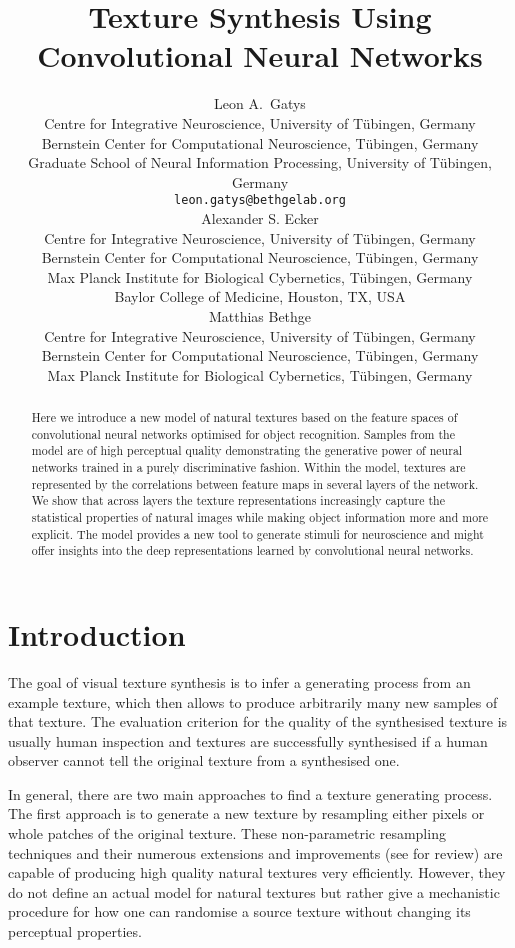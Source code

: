 \documentclass{article} %
\title{Texture Synthesis Using Convolutional Neural Networks}
\author{
Leon A.~Gatys\\
Centre for Integrative Neuroscience, University of T\"ubingen, Germany\\
Bernstein Center for Computational Neuroscience, T\"ubingen, Germany\\
Graduate School of Neural Information Processing, University of T\"ubingen, Germany\\
\texttt{leon.gatys@bethgelab.org} \\
\And
Alexander S. Ecker\\
Centre for Integrative Neuroscience, University of T\"ubingen, Germany\\
Bernstein Center for Computational Neuroscience, T\"ubingen, Germany\\
Max Planck Institute for Biological Cybernetics, T\"ubingen, Germany\\
Baylor College of Medicine, Houston, TX, USA\\
\And
Matthias Bethge \\
Centre for Integrative Neuroscience, University of T\"ubingen, Germany\\
Bernstein Center for Computational Neuroscience, T\"ubingen, Germany\\
Max Planck Institute for Biological Cybernetics, T\"ubingen, Germany\\
}
\begin{document}

\maketitle

\begin{abstract}
Here we introduce a new model of natural textures based on the feature spaces of convolutional neural networks optimised for object recognition. Samples from the model are of high perceptual quality demonstrating the generative power of neural networks trained in a purely discriminative fashion. 
Within the model, textures are represented by the correlations between feature maps in several layers of the network. We show that across layers the texture representations increasingly capture the statistical properties of natural images while making object information more and more explicit. 
The model provides a new tool to generate stimuli for neuroscience and might offer insights into the deep representations learned by convolutional neural networks.
\end{abstract}

\section{Introduction}
The goal of visual texture synthesis is to infer a generating process from an example texture, which then allows to produce arbitrarily many new samples of that texture. The evaluation criterion for the quality of the synthesised texture is usually human inspection and textures are successfully synthesised if a human observer cannot tell the original texture from a synthesised one. 

In general, there are two main approaches to find a texture generating process. The first approach is to generate a new texture by resampling either pixels \cite{efros_texture_1999, wei_fast_2000} or whole patches \cite{efros_image_2001, kwatra_graphcut_2003} of the original texture. These non-parametric resampling techniques and their numerous extensions and improvements (see \cite{wei_state_2009} for review) are capable of producing high quality natural textures very efficiently. However, they do not define an actual model for natural textures but rather give a mechanistic procedure for how one can randomise a source texture without changing its perceptual properties.
 
\end{document}
